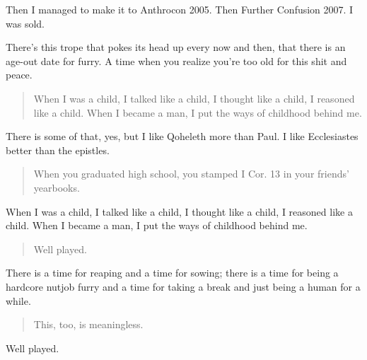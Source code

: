 Then I managed to make it to Anthrocon 2005. Then Further Confusion 2007. I was sold.

There's this trope that pokes its head up every now and then, that there is an age-out date for furry. A time when you realize you're too old for this shit and peace.

\begin{quote}
When I was a child, I talked like a child, I thought like a child, I reasoned like a child. When I became a man, I put the ways of childhood behind me.
\end{quote}

There is some of that, yes, but I like Qoheleth more than Paul. I like Ecclesiastes better than the epistles.

\begin{quote}
When you graduated high school, you stamped I Cor. 13 in your friends' yearbooks.
\end{quote}

When I was a child, I talked like a child, I thought like a child, I reasoned like a child. When I became a man, I put the ways of childhood behind me.

\begin{quote}
Well played.
\end{quote}

There is a time for reaping and a time for sowing; there is a time for being a hardcore nutjob furry and a time for taking a break and just being a human for a while.

\begin{quote}
This, too, is meaningless.
\end{quote}

Well played.
